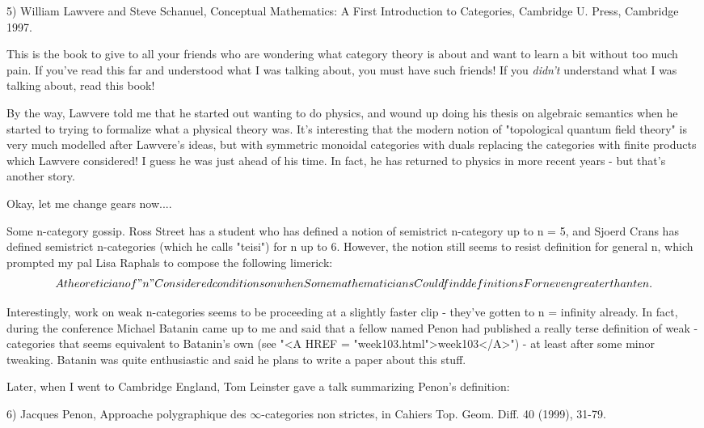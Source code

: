 5) William Lawvere and Steve Schanuel, Conceptual Mathematics:
A First Introduction to Categories, Cambridge U. Press, Cambridge 1997.

This is the book to give to all your friends who are wondering
what category theory is about and want to learn a bit without
too much pain.  If you've read this far and understood what I 
was talking about, you must have such friends!  If you \emph{didn't}
understand what I was talking about, read this book!

By the way, Lawvere told me that he started out wanting to do
physics, and wound up doing his thesis on algebraic semantics 
when he started to trying to formalize what a physical theory
was.   It's interesting that the modern notion of "topological
quantum field theory" is very much modelled after Lawvere's ideas,
but with symmetric monoidal categories with duals replacing the
categories with finite products which Lawvere considered!  I guess
he was just ahead of his time.  In fact, he has returned to physics
in more recent years - but that's another story.

Okay, let me change gears now....

Some n-category gossip.  Ross Street has a student who has defined a
notion of semistrict n-category up to n = 5, and Sjoerd Crans has
defined semistrict n-categories (which he calls "teisi") for n up to
6.  However, the notion still seems to resist definition for general
n, which prompted my pal Lisa Raphals to compose the following
limerick:
$$
     A theoretician of "n"
     Considered conditions on when
     Some mathematicians
     Could find definitions 
     For n even greater than ten.
$$
    
Interestingly, work on weak n-categories seems to be proceeding at
a slightly faster clip - they've gotten to n = infinity already.  
In fact, during the conference Michael Batanin came up to me and said
that a fellow named Penon had published a really terse definition of 
weak \omega -categories that seems equivalent to Batanin's own 
(see "<A HREF = "week103.html">week103</A>") - at least after some minor tweaking.  Batanin was quite 
enthusiastic and said he plans to write a paper about this stuff.  

Later, when I went to Cambridge England, Tom Leinster gave a talk
summarizing Penon's definition:

6) Jacques Penon, Approache polygraphique des $\infty$-categories
non strictes, in Cahiers Top. Geom. Diff. 40 (1999), 31-79.

